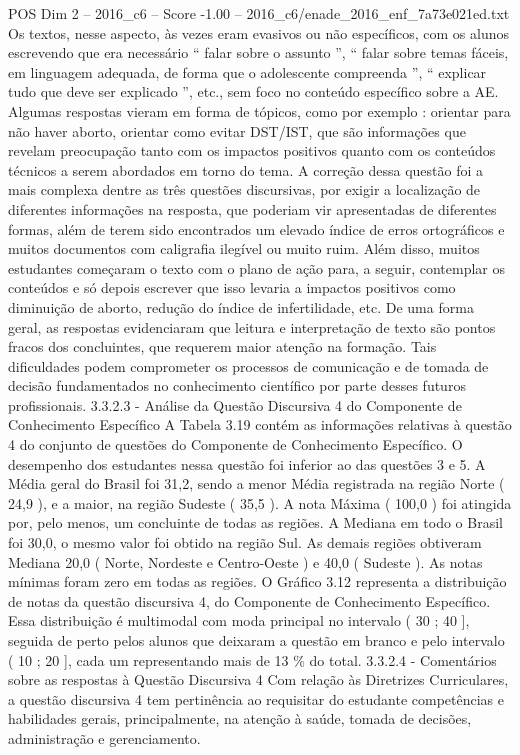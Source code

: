 \begin{textsample}{POS Dim 2 – 2016\_c6 – Score -1.00 – 2016\_c6/enade\_2016\_enf\_7a73e021ed.txt}
Os textos, nesse aspecto, às vezes eram evasivos ou não específicos, com os alunos escrevendo que era necessário “ falar sobre o assunto ”, “ falar sobre temas fáceis, em linguagem adequada, de forma que o adolescente compreenda ”, “ explicar tudo que deve ser explicado ”, etc., sem foco no conteúdo específico sobre a AE.
Algumas respostas vieram em forma de tópicos, como por exemplo : orientar para não haver aborto, orientar como evitar DST/IST, que são informações que revelam preocupação tanto com os impactos positivos quanto com os conteúdos técnicos a serem abordados em torno do tema.
A correção dessa questão foi a mais complexa dentre as três questões discursivas, por exigir a localização de diferentes informações na resposta, que poderiam vir apresentadas de diferentes formas, além de terem sido encontrados um elevado índice de erros ortográficos e muitos documentos com caligrafia ilegível ou muito ruim.
Além disso, muitos estudantes começaram o texto com o plano de ação para, a seguir, contemplar os conteúdos e só depois escrever que isso levaria a impactos positivos como diminuição de aborto, redução do índice de infertilidade, etc.
De uma forma geral, as respostas evidenciaram que leitura e interpretação de texto são pontos fracos dos concluintes, que requerem maior atenção na formação.
Tais dificuldades podem comprometer os processos de comunicação e de tomada de decisão fundamentados no conhecimento científico por parte desses futuros profissionais. 3.3.2.3 - Análise da Questão Discursiva 4 do Componente de Conhecimento Específico A Tabela 3.19 contém as informações relativas à questão 4 do conjunto de questões do Componente de Conhecimento Específico.
O desempenho dos estudantes nessa questão foi inferior ao das questões 3 e 5.
A Média geral do Brasil foi 31,2, sendo a menor Média registrada na região Norte ( 24,9 ), e a maior, na região Sudeste ( 35,5 ).
A nota Máxima ( 100,0 ) foi atingida por, pelo menos, um concluinte de todas as regiões.
A Mediana em todo o Brasil foi 30,0, o mesmo valor foi obtido na região Sul.
As demais regiões obtiveram Mediana 20,0 ( Norte, Nordeste e Centro-Oeste ) e 40,0 ( Sudeste ).
As notas mínimas foram zero em todas as regiões.
O Gráfico 3.12 representa a distribuição de notas da questão discursiva 4, do Componente de Conhecimento Específico.
Essa distribuição é multimodal com moda principal no intervalo ( 30 ; 40 ], seguida de perto pelos alunos que deixaram a questão em branco e pelo intervalo ( 10 ; 20 ], cada um representando mais de 13 \% do total. 3.3.2.4 - Comentários sobre as respostas à Questão Discursiva 4 Com relação às Diretrizes Curriculares, a questão discursiva 4 tem pertinência ao requisitar do estudante competências e habilidades gerais, principalmente, na atenção à saúde, tomada de decisões, administração e gerenciamento.

\end{textsample}
